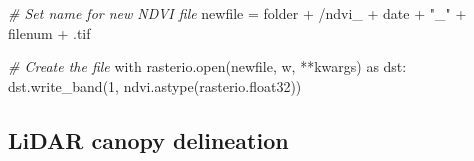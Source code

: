 \documentclass[12pt,twoside]{reedthesis}
\newenvironment{Shaded}{\begin{snugshade}}{\end{snugshade}}
\newcommand{\CommentTok}[1]{\textcolor[rgb]{0.56,0.35,0.01}{\textit{#1}}}
\newcommand{\DecValTok}[1]{\textcolor[rgb]{0.00,0.00,0.81}{#1}}
\newcommand{\FunctionTok}[1]{\textcolor[rgb]{0.00,0.00,0.00}{#1}}
\newcommand{\NormalTok}[1]{#1}
\newcommand{\OtherTok}[1]{\textcolor[rgb]{0.56,0.35,0.01}{#1}}
\newcommand{\SpecialCharTok}[1]{\textcolor[rgb]{0.00,0.00,0.00}{#1}}
\newcommand{\StringTok}[1]{\textcolor[rgb]{0.31,0.60,0.02}{#1}}
\begin{document}
\begin{Shaded}
\begin{Highlighting}[]
    \CommentTok{\# Set name for new NDVI file}
\NormalTok{    newfile }\OtherTok{=}\NormalTok{ folder }\SpecialCharTok{+} \StringTok{\textquotesingle{}/ndvi\_\textquotesingle{}} \SpecialCharTok{+}\NormalTok{ date }\SpecialCharTok{+} \StringTok{"\_"} \SpecialCharTok{+}\NormalTok{ filenum }\SpecialCharTok{+} \StringTok{\textquotesingle{}.tif\textquotesingle{}}

    \CommentTok{\# Create the file}
\NormalTok{    with }\FunctionTok{rasterio.open}\NormalTok{(newfile, }\StringTok{\textquotesingle{}w\textquotesingle{}}\NormalTok{, }\SpecialCharTok{**}\NormalTok{kwargs) as dst}\SpecialCharTok{:}
        \FunctionTok{dst.write\_band}\NormalTok{(}\DecValTok{1}\NormalTok{, }\FunctionTok{ndvi.astype}\NormalTok{(rasterio.float32))}
\end{Highlighting}
\end{Shaded}
\hypertarget{lidar-canopy-delineation}{%
\subsection*{LiDAR canopy delineation}\label{lidar-canopy-delineation}}
\end{document}
